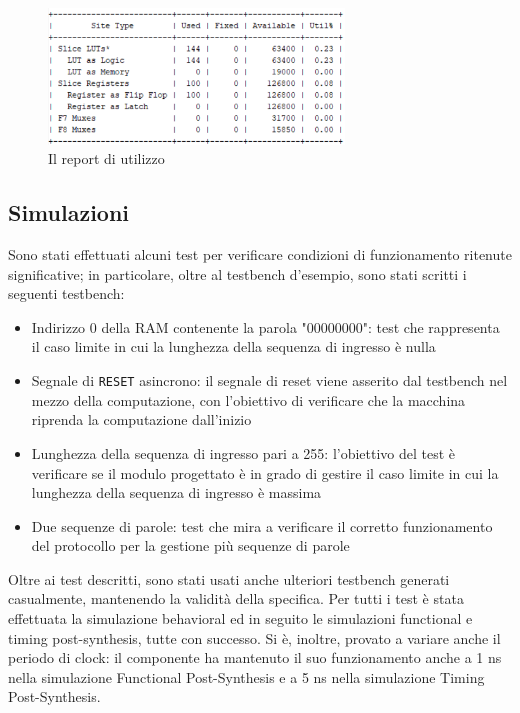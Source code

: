 \documentclass{article}
\begin{document}
\begin{figure}
\centering
\includegraphics[width=0.7\textwidth]{utilization_report.png}
\caption{\label{fig:report_utilizzo}Il report di utilizzo}
\end{figure}

\subsection{Simulazioni}
Sono stati effettuati alcuni test per verificare condizioni di funzionamento ritenute significative; in particolare, oltre al testbench d'esempio, sono stati scritti i seguenti testbench:
\begin{itemize}
    \item Indirizzo 0 della RAM contenente la parola "00000000": test che rappresenta il caso limite in cui la lunghezza della sequenza di ingresso è nulla
    \item Segnale di \texttt{RESET} asincrono: il segnale di reset viene asserito dal testbench nel mezzo della computazione, con l'obiettivo di verificare che la macchina riprenda la computazione dall'inizio
    \item Lunghezza della sequenza di ingresso pari a 255: l'obiettivo del test è verificare se il modulo progettato è in grado di gestire il caso limite in cui la lunghezza della sequenza di ingresso è massima
    \item Due sequenze di parole: test che mira a verificare il corretto funzionamento del protocollo per la gestione più sequenze di parole
\end{itemize}
Oltre ai test descritti, sono stati usati anche ulteriori testbench generati casualmente, mantenendo la validità della specifica. Per tutti i test è stata effettuata la simulazione behavioral ed in seguito le simulazioni functional e timing post-synthesis, tutte con successo. Si è, inoltre, provato a variare anche il periodo di clock: il componente ha mantenuto il suo funzionamento anche a 1 ns nella simulazione Functional Post-Synthesis e a 5 ns nella simulazione Timing Post-Synthesis.
\end{document}
